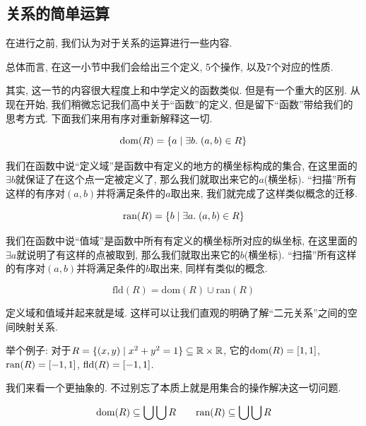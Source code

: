 \subsection{关系的简单运算}

在进行之前, 我们认为对于关系的运算进行一些内容. 

总体而言, 在这一小节中我们会给出三个定义, 5个操作, 以及7个对应的性质. 

其实, 这一节的内容很大程度上和中学定义的函数类似. 但是有一个重大的区别. 从现在开始, 我们稍微忘记我们高中关于``函数''的定义, 但是留下``函数''带给我们的思考方式. 下面我们来用有序对重新解释这一切. 


\begin{definition}
  \[
    \text{dom}(R) = \{a \mid \exists b.\; (a,b) \in R\}
  \]
\end{definition}

我们在函数中说``定义域''是函数中有定义的地方的横坐标构成的集合, 在这里面的$\exists b$就保证了在这个点一定被定义了, 那么我们就取出来它的$a$(横坐标). ``扫描''所有这样的有序对$(a,b)$并将满足条件的$a$取出来, 我们就完成了这样类似概念的迁移. 

\begin{definition}[值域 (Range)]
  \[
    \text{ran}(R) = \{b \mid \exists a.\; (a,b) \in R\}
  \]
\end{definition}

我们在函数中说``值域''是函数中所有有定义的横坐标所对应的纵坐标, 在这里面的$\exists a$就说明了有这样的点被取到, 那么我们就取出来它的$b$(横坐标). ``扫描''所有这样的有序对$(a,b)$并将满足条件的$b$取出来, 同样有类似的概念. 

\begin{definition}[域 (Field)]
  \[
    \text{fld}(R) = \text{dom}(R) \cup \text{ran}(R)
  \]
\end{definition}

定义域和值域并起来就是域. 这样可以让我们直观的明确了解``二元关系''之间的空间映射关系. 

举个例子: 对于$R = \{(x, y) \mid x^2 + y^2 = 1\} \subseteq \mathbb{R} \times \mathbb{R}$, 它的$\text{dom}(R) = [1, 1]$, $\text{ran}(R) = [-1, 1]$, $\text{fld}(R) = [-1, 1]$. 

我们来看一个更抽象的. 不过别忘了本质上就是用集合的操作解决这一切问题. 

\begin{theorem}
  \[
    \text{dom}(R) \subseteq \bigcup \bigcup R \qquad
    \text{ran}(R) \subseteq \bigcup \bigcup R
  \]
\end{theorem}

